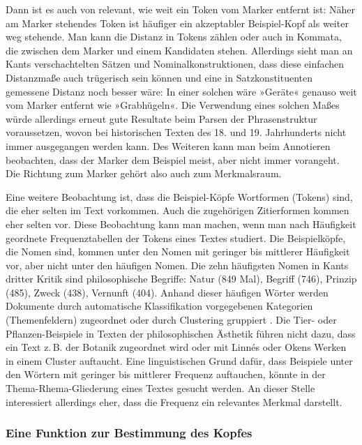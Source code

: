 \documentclass{article}
\begin{document}
Dann ist es auch von relevant, wie weit ein Token vom Marker entfernt
ist: Näher am Marker stehendes Token ist häufiger ein akzeptabler
Beispiel-Kopf als weiter weg stehende. Man kann die Distanz in Tokens
zählen oder auch in Kommata, die zwischen dem Marker und einem
Kandidaten stehen. Allerdings sieht man an Kants verschachtelten
Sätzen und Nominalkonstruktionen, dass diese einfachen Distanzmaße
auch trügerisch sein können und eine in Satzkonstituenten gemessene
Distanz noch besser wäre: In einer solchen wäre »Geräte« genauso weit
vom Marker entfernt wie »Grabhügeln«. Die Verwendung eines solchen
Maßes würde allerdings erneut gute Resultate beim Parsen der
Phrasenstruktur voraussetzen, wovon bei historischen Texten des
18. und 19. Jahrhunderts nicht immer ausgegangen werden kann. Des
Weiteren kann man beim Annotieren beobachten, dass der Marker dem
Beispiel meist, aber nicht immer vorangeht. Die Richtung zum Marker
gehört also auch zum Merkmalsraum.

Eine weitere Beobachtung ist, dass die Beispiel-Köpfe Wortformen
(Tokens) sind, die eher selten im Text vorkommen. Auch die zugehörigen
Zitierformen kommen eher selten vor. Diese Beobachtung kann man
machen, wenn man nach Häufigkeit geordnete Frequenztabellen der Tokens
eines Textes studiert. Die Beispielköpfe, die Nomen sind, kommen unter
den Nomen mit geringer bis mittlerer Häufigkeit vor, aber nicht unter
den häufigen Nomen. Die zehn häufigsten Nomen in Kants dritter Kritik
sind philosophische Begriffe: Natur (849 Mal), Begriff (746), Prinzip
(485), Zweck (438), Vernunft (404). Anhand dieser häufigen Wörter
werden Dokumente durch automatische Klassifikation vorgegebenen
Kategorien (Themenfeldern) zugeordnet \parencite{Sebastiani2002a} oder
durch Clustering gruppiert \parencite[195--209]{Heyer2006a}. Die Tier-
oder Pflanzen-Beispiele in Texten der philosophischen Ästhetik führen
nicht dazu, dass ein Text z.\,B. der Botanik zugeordnet wird oder mit
Linnés oder Okens Werken in einem Cluster auftaucht. Eine
linguistischen Grund dafür, dass Beispiele unter den Wörtern mit
geringer bis mittlerer Frequenz auftauchen, könnte in der
Thema-Rhema-Gliederung eines Textes gesucht
werden. \Parencite[784-786]{Bussm1990} An dieser Stelle interessiert
allerdings eher, dass die Frequenz ein relevantes Merkmal darstellt.

\subsubsection{Eine Funktion zur Bestimmung des Kopfes}
\end{document}
